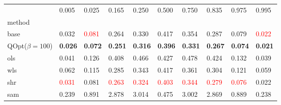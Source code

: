 \begin{tabular}{llllllllll}
\toprule
 & 0.005 & 0.025 & 0.165 & 0.250 & 0.500 & 0.750 & 0.835 & 0.975 & 0.995 \\
method &  &  &  &  &  &  &  &  &  \\
\midrule
base & 0.032 & \textcolor{red}{0.081} & 0.264 & 0.330 & 0.417 & 0.354 & 0.287 & 0.079 & \textcolor{red}{0.022} \\
\midrule
QOpt($\beta=100$) & \textbf{0.026} & \textbf{0.072} & \textbf{0.251} & \textbf{0.316} & \textbf{0.396} & \textbf{0.331} & \textbf{0.267} & \textbf{0.074} & \textbf{0.021} \\
ols & 0.041 & 0.126 & 0.408 & 0.466 & 0.427 & 0.478 & 0.424 & 0.132 & 0.039 \\
wls & 0.062 & 0.115 & 0.285 & 0.343 & 0.417 & 0.361 & 0.304 & 0.121 & 0.059 \\
shr & \textcolor{red}{0.031} & 0.081 & \textcolor{red}{0.263} & \textcolor{red}{0.324} & \textcolor{red}{0.403} & \textcolor{red}{0.344} & \textcolor{red}{0.279} & \textcolor{red}{0.076} & 0.022 \\
sam & 0.239 & 0.891 & 2.878 & 3.014 & 0.475 & 3.002 & 2.869 & 0.889 & 0.238 \\
\bottomrule
\end{tabular}